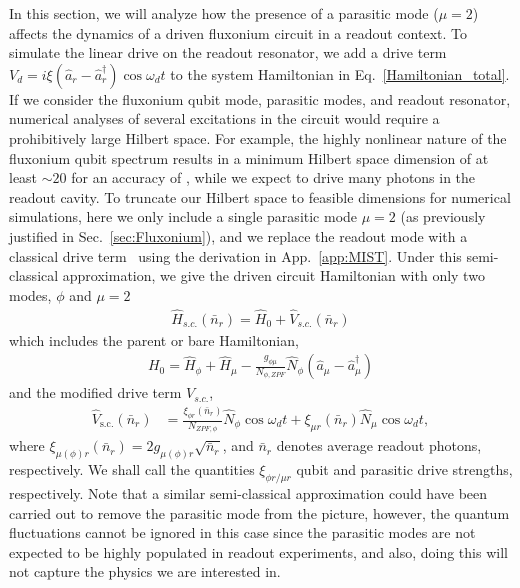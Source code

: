 \documentclass[%
reprint,
superscriptaddress,
 amsmath,amssymb,
 aps,
 prx,
longbibliography,
floatfix,
]{revtex4-2}
\newcommand{\singh}[1]{{\color{orange}{{}#1}}}%
\begin{document}
 In this section, we will analyze how the presence of a parasitic mode ($\mu=2$) affects the dynamics of a driven fluxonium circuit in a readout context. To simulate the linear drive on the readout resonator, we add a drive term $V_d=i\xi (\hat a_r-\hat a_r^\dagger)\cos{\omega_d t}$ to the system Hamiltonian in Eq.~\ref{Hamiltonian_total}. If we consider the fluxonium qubit mode, parasitic modes, and readout resonator, numerical analyses of several excitations in the circuit would require a prohibitively large Hilbert space. For example, the highly nonlinear nature of the fluxonium qubit spectrum results in a minimum Hilbert space dimension of at least $\sim 20$ for an accuracy of \singh{$1$ MHz}, while we expect to drive many photons in the readout cavity. To truncate our Hilbert space to feasible dimensions for numerical simulations, here we only include a single parasitic mode $\mu=2$ (as previously justified in Sec.~\ref{sec:Fluxonium}), and we replace the readout mode with a classical drive term~\cite{cohen2023reminiscence,dumas2024unified,xiao2023diagrammatic} using the derivation in App.~\ref{app:MIST}. Under this semi-classical approximation, we give the driven circuit Hamiltonian with only two modes, $\phi$ and $\mu=2$
\begin{align}
  \hat H_{s.c.}(\bar n_r)=\hat H_0+\hat V_{s.c.}(\bar n_r)  \label{eq:drive_Ham}
\end{align}
 which includes the parent or bare Hamiltonian,
\begin{align}
H_0=\hat H_\phi+\hat H_{\mu}-\frac{g_{\phi\mu}}{N_{\phi,ZPF}} \hat N_\phi (\hat a_{\mu}-\hat a_{\mu}^\dagger) \label{eq:bare_ham} 
\end{align}
and the modified drive term $V_{s.c.}$,
\begin{align}
    \hat V_\textrm{s.c.}(\bar n_r)&=\frac{\xi_{\phi r}(\bar n_r)}{N_{ZPF,\phi}} \hat N_\phi\cos{\omega_d t}+\xi_{\mu r}(\bar n_r) \hat N_\mu\cos{\omega_d t}\label{eq:drive},
\end{align}
where $\xi_{\mu(\phi) r}(\bar n_r)=2g_{\mu(\phi) r}\sqrt{\bar n_r}$, and $\bar n_r$ denotes average readout photons, respectively. We shall call the quantities $\xi_{\phi r/\mu r}$ qubit and parasitic drive strengths, respectively. Note that a similar semi-classical approximation could have been carried out to remove the parasitic mode from the picture, however, the quantum fluctuations cannot be ignored in this case since the parasitic modes are not expected to be highly populated in readout experiments, and also, doing this will not capture the physics we are interested in. 
\end{document}
